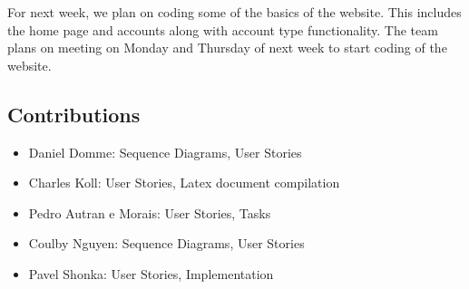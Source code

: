 \documentclass[12pt]{article}
\begin{document}
For next week, we plan on coding some of the basics of the website. This includes the home
page and accounts along with account type functionality. The team plans on meeting on
Monday and Thursday of next week to start coding of the website.

\quad

\subsection{Contributions}
\begin{itemize}
\item
	Daniel Domme: Sequence Diagrams, User Stories
\item
	Charles Koll: User Stories, Latex document compilation
\item
	Pedro Autran e Morais: User Stories, Tasks
\item
	Coulby Nguyen: Sequence Diagrams, User Stories
\item
	Pavel Shonka: User Stories, Implementation
\end{itemize}
\end{document}
